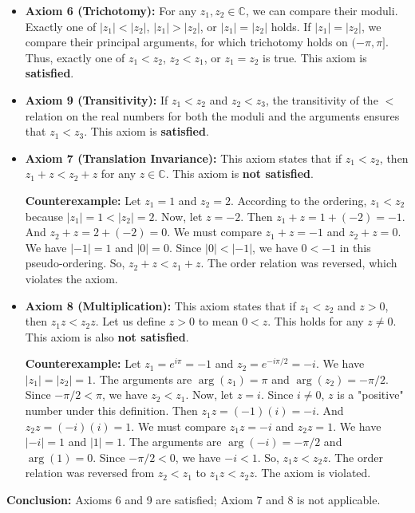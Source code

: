 \begin{itemize}
    \item \textbf{Axiom 6 (Trichotomy):} For any $z_1, z_2 \in \mathbb{C}$, we can compare their moduli. Exactly one of $|z_1| < |z_2|$, $|z_1| > |z_2|$, or $|z_1| = |z_2|$ holds. If $|z_1| = |z_2|$, we compare their principal arguments, for which trichotomy holds on $(-\pi, \pi]$. Thus, exactly one of $z_1 < z_2$, $z_2 < z_1$, or $z_1 = z_2$ is true. This axiom is \textbf{satisfied}.

    \item \textbf{Axiom 9 (Transitivity):} If $z_1 < z_2$ and $z_2 < z_3$, the transitivity of the $<$ relation on the real numbers for both the moduli and the arguments ensures that $z_1 < z_3$. This axiom is \textbf{satisfied}.

    \item \textbf{Axiom 7 (Translation Invariance):} This axiom states that if $z_1 < z_2$, then $z_1 + z < z_2 + z$ for any $z \in \mathbb{C}$. This axiom is \textbf{not satisfied}.
    
    \textbf{Counterexample:} Let $z_1 = 1$ and $z_2 = 2$. According to the ordering, $z_1 < z_2$ because $|z_1|=1 < |z_2|=2$.
    Now, let $z = -2$.
    Then $z_1 + z = 1 + (-2) = -1$.
    And $z_2 + z = 2 + (-2) = 0$.
    We must compare $z_1+z = -1$ and $z_2+z=0$.
    We have $|-1|=1$ and $|0|=0$. Since $|0| < |-1|$, we have $0 < -1$ in this pseudo-ordering.
    So, $z_2 + z < z_1 + z$. The order relation was reversed, which violates the axiom.

    \item \textbf{Axiom 8 (Multiplication):} This axiom states that if $z_1 < z_2$ and $z > 0$, then $z_1 z < z_2 z$. Let us define $z>0$ to mean $0<z$. This holds for any $z \neq 0$. This axiom is also \textbf{not satisfied}.
    
    \textbf{Counterexample:} Let $z_1 = e^{i\pi} = -1$ and $z_2 = e^{-i\pi/2} = -i$.
    We have $|z_1| = |z_2| = 1$. The arguments are $\arg(z_1) = \pi$ and $\arg(z_2) = -\pi/2$. Since $-\pi/2 < \pi$, we have $z_2 < z_1$.
    Now, let $z = i$. Since $i \neq 0$, $z$ is a "positive" number under this definition.
    Then $z_1 z = (-1)(i) = -i$.
    And $z_2 z = (-i)(i) = 1$.
    We must compare $z_1 z = -i$ and $z_2 z = 1$.
    We have $|-i|=1$ and $|1|=1$. The arguments are $\arg(-i) = -\pi/2$ and $\arg(1) = 0$. Since $-\pi/2 < 0$, we have $-i < 1$.
    So, $z_1 z < z_2 z$. The order relation was reversed from $z_2 < z_1$ to $z_1 z < z_2 z$. The axiom is violated.
\end{itemize}
\textbf{Conclusion:} Axioms 6 and 9 are satisfied; Axiom 7 and 8 is not applicable.



